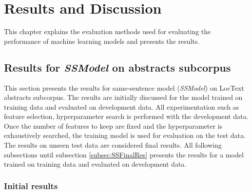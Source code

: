 \chapter{Results and Discussion}\label{chapter:results}

This chapter explains the evaluation methods used for evaluating the performance of machine learning models and presents the results.

\section{Results for \textit{SSModel} on abstracts subcorpus}

This section presents the results for same-sentence model (\textit{SSModel}) on LocText abstracts subcorpus. The results are initially discussed for the model trained on training data and evaluated on development data. All experimentation such as feature selection, hyperparameter search is performed with the development data. Once the number of features to keep are fixed and the hyperparameter is exhaustively searched, the training model is used for evaluation on the test data. The results on unseen test data are considered final results. All following subsections until subsection \ref{subsec:SSFinalRes} presents the results for a model trained on training data and evaluated on development data.


\subsection{Initial results}

